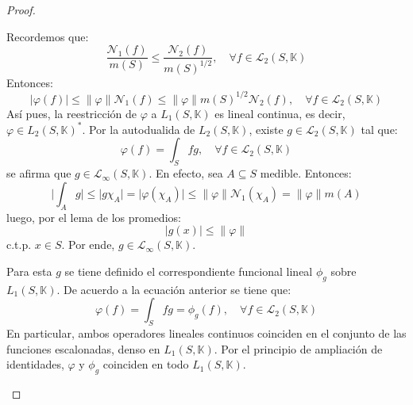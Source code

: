\documentclass[12pt]{report}
\theoremstyle{largebreak}
\newcommand\abs[1]{\ensuremath{\big|#1\big|}}
\newcommand\norm[1]{\ensuremath{\|#1\|}}
\newcommand{\N}[2]{\ensuremath{\mathcal{N}_{#1}\left(#2\right)}}
\begin{document}
\begin{proof}
\begin{enumerate}
            Recordemos que:
            \begin{equation*}
                \frac{\N{1}{f}}{m(S)}\leq\frac{\N{2}{f}}{m(S)^{1/2}},\quad\forall f\in\mathcal{L}_2(S,\mathbb{K})
            \end{equation*}
            Entonces:
            \begin{equation*}
                \abs{\varphi(f)}\leq\norm{\varphi}\N{1}{f}\leq\norm{\varphi}m(S)^{1/2}\N{2}{f},\quad\forall f\in\mathcal{L}_2(S,\mathbb{K})
            \end{equation*}
            Así pues, la reestricción de $\varphi$ a $L_1(S,\mathbb{K})$ es lineal continua, es decir, $\varphi\in L_2(S,\mathbb{K})^*$. Por la autodualida de $L_2(S,\mathbb{K})$, existe $g\in\mathcal{L}_2(S,\mathbb{K})$ tal que:
            \begin{equation}
                \varphi(f)=\int_Sfg,\quad\forall f\in\mathcal{L}_2(S,\mathbb{K})
            \end{equation}
            se afirma que $g\in \mathcal{L}_\infty(S,\mathbb{K})$. En efecto, sea $A\subseteq S$ medible. Entonces:
            \begin{equation*}
                \abs{\int_Ag}\leq \abs{g\chi_A}=\abs{\varphi(\chi_A)}\leq\norm{\varphi}\N{1}{\chi_A}=\norm{\varphi}m(A)
            \end{equation*}
            luego, por el lema de los promedios:
            \begin{equation*}
                \abs{g(x)}\leq\norm{\varphi}
            \end{equation*}
            c.t.p. $x\in S$. Por ende, $g\in \mathcal{L}_\infty(S,\mathbb{K})$.

            Para esta $g$ se tiene definido el correspondiente funcional lineal $\phi_g$ sobre $L_1(S,\mathbb{K})$. De acuerdo a la ecuación anterior se tiene que:
            \begin{equation*}
                \varphi(f)=\int_Sfg=\phi_g(f),\quad\forall f\in\mathcal{L}_2(S,\mathbb{K})
            \end{equation*}
            En particular, ambos operadores lineales continuos coinciden en el conjunto de las funciones escalonadas, denso en $L_1(S,\mathbb{K})$. Por el principio de ampliación de identidades, $\varphi$ y $\phi_g$ coinciden en todo $L_1(S,\mathbb{K})$.


\end{enumerate}
\end{proof}
\end{document}
